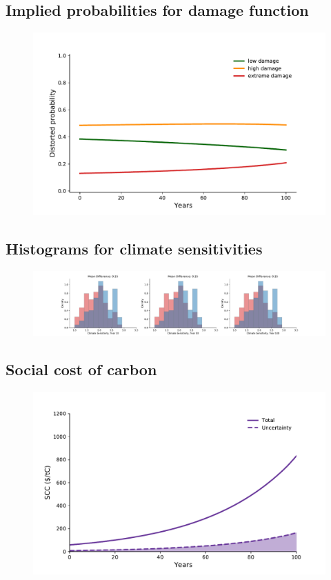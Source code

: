 \documentclass[11pt]{article}
\begin{document}
\subsection{Implied probabilities for damage function}
\begin{figure}[H]
		\center
		\includegraphics[height=.35\textheight]{damage_probability.pdf}
\end{figure}

\subsection{Histograms for climate sensitivities}
\begin{figure}[H]
		\center
		\includegraphics[height=.2\textheight]{climate_histogram.pdf}
\end{figure}

\subsection{Social cost of carbon}
\begin{figure}[H]
		\center
		\includegraphics[height=.35\textheight]{scc.pdf}
\end{figure}
\end{document}
